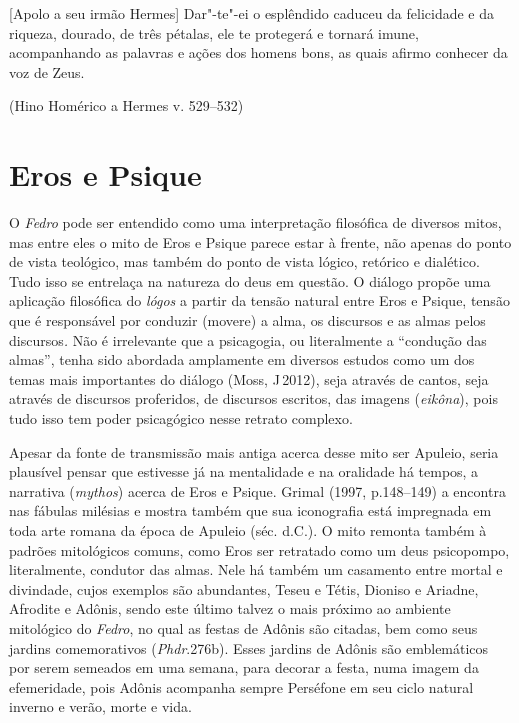 

\epigraph{[Apolo a seu irmão Hermes] Dar"-te"-ei o esplêndido caduceu da felicidade e da riqueza, dourado, de
três pétalas, ele te protegerá e tornará imune, acompanhando as
palavras e ações dos homens bons, as quais afirmo conhecer da voz de
Zeus.}{(Hino Homérico a Hermes v. 529--532)} 


\section{Eros e Psique}
 

O \emph{Fedro} pode ser entendido como uma interpretação filosófica de
diversos mitos, mas entre eles o mito de Eros e Psique parece estar à
frente, não apenas do ponto de vista teológico, mas também do ponto de
vista lógico, retórico e dialético. Tudo isso se entrelaça na natureza
do deus em questão. O diálogo propõe uma aplicação filosófica
do \emph{lógos} a partir da tensão natural entre Eros e Psique, tensão
que é responsável por conduzir (movere) a alma, os discursos e as almas
pelos discursos\emph{.} Não é irrelevante que a psicagogia, ou
literalmente a ``condução das almas'', tenha sido abordada amplamente em
diversos estudos como um dos temas mais importantes do diálogo (Moss, J\,2012), seja através de cantos, seja através de discursos proferidos, de
discursos escritos, das imagens (\emph{eikôna}), pois tudo isso tem
poder psicagógico nesse retrato complexo.

Apesar da fonte de transmissão mais antiga acerca desse mito ser
Apuleio, seria plausível pensar que estivesse já na mentalidade e na
oralidade há tempos, a narrativa (\emph{mythos}) acerca de Eros e
Psique. Grimal (1997, p.148--149) a encontra nas fábulas milésias e
mostra também que sua iconografia está impregnada em toda arte romana da
época de Apuleio (séc.  d.C.). O mito remonta também à padrões
mitológicos comuns, como Eros ser retratado como um deus psicopompo,
literalmente, condutor das almas. Nele há também um casamento entre
mortal e divindade, cujos exemplos são abundantes, Teseu e Tétis,
Dioniso e Ariadne, Afrodite e Adônis, sendo este último talvez o mais
próximo ao ambiente mitológico do \emph{Fedro}, no qual as festas de
Adônis são citadas, bem como seus jardins comemorativos
(\emph{Phdr}.276b). Esses jardins de Adônis são emblemáticos por serem
semeados em uma semana, para decorar a festa, numa imagem da
efemeridade, pois Adônis acompanha sempre Perséfone em seu ciclo natural
inverno e verão, morte e vida.

